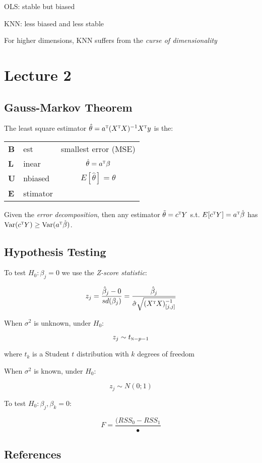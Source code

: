 \documentclass[twoside,twocolumn,10pt]{revtex4-1}
\begin{document}
	OLS: stable but biased
	
	KNN: less biased and less stable
	
	For higher dimensions, KNN suffers from the \textit{curse of dimensionality}
	
	\section{Lecture 2}
	
	\subsection{Gauss-Markov Theorem}
	
	The least square estimator $\hat{\theta} = a^\textsc{t}(X^\textsc{t}X)^{-1}X^\textsc{t}y$ is the:
	
	\begin{tabular}{l l c}
	\textbf{B} & est & smallest error (MSE) \\
	\textbf{L} & inear & $\hat{\theta} = a^\textsc{t} \beta$ \\
	\textbf{U} & nbiased & $E[\hat{\theta}] = \theta$ \\
	\textbf{E} & stimator &
	\end{tabular}
	
	Given the \textit{error decomposition}, then any estimator $\tilde{\theta} = c^\textsc{t}Y$ s.t. $E[c^\textsc{t}Y] = a^\textsc{t} \hat{\beta}$ has $\text{Var}(c^\textsc{t}Y) \geq \text{Var}(a^\textsc{t}\hat{\beta})$.
	
	\subsection{Hypothesis Testing}
	
	To test $H_0 : \beta_j = 0$ we use the \textit{Z-score statistic}:
	
	\begin{equation}
	z_j = \frac{\hat{\beta}_j - 0}{sd(\beta_j)} = \frac{\hat{\beta}_j}{\hat{\sigma} \sqrt{(X^\textsc{t}X)_{[j,j]}^{-1}}}
	\end{equation}
	
	When $\sigma^2$ is unknown, under $H_0$:
	
	\begin{equation}
	z_j \sim t_{\textsc{n}-p-1}
	\end{equation}
	
	where $t_k$ is a Student $t$ distribution with $k$ degrees of freedom
	
	When $\sigma^2$ is known, under $H_0$:
	
	\begin{equation}
	z_j \sim N(0;1)
	\end{equation}
	
	To test $H_0 : \beta_j, \beta_k = 0$:
	
	\begin{equation}
	F = \frac{(RSS_0 - RSS_1}{•}
	\end{equation}
	
	
	\subsection*{References}
	
	
	
	


	
\end{document}
